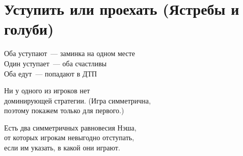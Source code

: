 \section{Уступить или проехать (Ястребы и голуби)}

\newcommand{\yieldPO}{\gamePayoffs{-1}{-1}{1}{2}{2}{1}{-11}{-11}}


\begin{frame} 
	Оба уступают~— заминка на одном месте\\
	Один уступает~— оба счастливы\\
	Оба едут~— попадают в ДТП
\begin{center}  \end{center}
\end{frame}


\begin{frame} 
	Ни у одного из игроков нет\\
	доминирующей стратегии. (Игра симметрична,\\
	поэтому покажем только для первого.)
\begin{center}  \end{center}
\end{frame}


\begin{frame} 
	Есть два симметричных равновесия Нэша,\\
	от которых игрокам невыгодно отступать,\\
	если им указать, в какой они играют.
\begin{center}  \end{center}
\end{frame}


